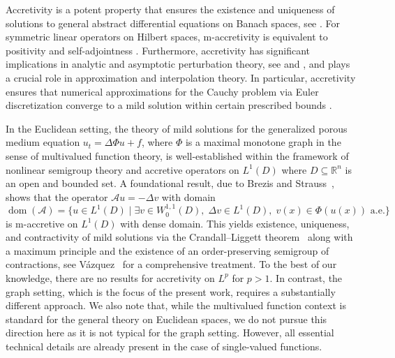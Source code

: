 \documentclass[letterpaper]{article}
\theoremstyle{definition}
\theoremstyle{named}
\numberwithin{equation}{section}
\newcommand{\R}{\mathbb{R}}
\begin{document}
Accretivity is a potent property that ensures the existence and uniqueness of solutions to general abstract differential equations on Banach spaces, see \cite{benilan1988evolution, barbu2010nonlinear}. For symmetric linear operators on Hilbert spaces,  m-accretivity 
is equivalent
to positivity and self-adjointness \cite[Problem V.3.32]{kato2013perturbation}. Furthermore, accretivity has significant implications in analytic and asymptotic perturbation theory, see \cite[Chapter 13]{goebel1990topics} and \cite{neidhardt2018operator}, and plays a crucial role in approximation and interpolation theory. In particular, accretivity ensures that numerical approximations for the Cauchy problem via Euler discretization converge to a mild solution within certain prescribed bounds \cite{nochetto2006nonlinear,chill2024real,beurich2024interpolation}.


In the Euclidean setting, the theory of mild solutions for the generalized porous medium equation $u_t = \Delta\Phi u + f$, where $\Phi$ is a maximal monotone graph in the sense of multivalued
function theory, is well-established within the framework of nonlinear semigroup theory and 
accretive operators on $L^1(D)$
where $D \subseteq \R^n$ is an open and bounded set. 
A foundational result, due to Brezis and Strauss~\cite{BrezisStraussJFA1973}, shows that the operator $\mathcal{A}u = -\Delta v$ with domain
\[
\operatorname{dom}(\mathcal{A}) = \bigl\{u \in L^1(D) \mid \exists v \in W_0^{1,1}(D),\; \Delta v \in L^1(D),\; v(x) \in \Phi(u(x)) \text{ a.e.}\bigr\}
\]
is m-accretive  on $L^1(D)$ with dense domain. This yields existence, uniqueness, and contractivity of mild solutions via the Crandall--Liggett theorem~\cite{CrandallLiggett1971} along with a maximum principle and the existence of
an order-preserving semigroup of contractions, see V\'{a}zquez~\cite[Chapter 10]{vazquez2007porous} for a comprehensive treatment. To the best of our knowledge, there are no results
for accretivity on $L^p$ for $p > 1$. 
In contrast, the graph setting, which is the focus of the present work, requires a substantially different approach. We also note that, while the multivalued function context
is standard for the general theory on Euclidean spaces, we do not pursue
this direction here as it is not typical for the graph setting. However, all essential technical
details are already present in the case of single-valued functions.
\end{document}
